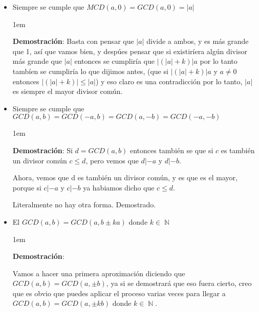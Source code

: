 \documentclass[12pt]{report}                                    %
\newenvironment{SmallIndentation}[1][0.75em]                    %
    {\begin{adjustwidth}{#1}{}\begin{footnotesize}}                 %
    {\end{footnotesize}\end{adjustwidth}}                           %
\DeclareMathOperator \Naturals  {\mathbb{N}}                     %
\begin{document}
\begin{itemize}
                \item Siempre se cumple que $MCD(a,0) = GCD(a,0) = |a|$

                    \begin{SmallIndentation}[1em]
                        \textbf{Demostración}:
                        Basta con pensar que $|a|$ divide a ambos, y es más grande que 1, así
                        que vamos bien, y despúes pensar que si existiríera algún divisor más
                        grande que $|a|$ entonces se cumpliría que  $|(|a|+k)|a$ por lo tanto tambíen
                        se cumpliría lo que dijimos antes, (que si $|(|a|+k)|a$ y $a \neq 0$
                        entonces $|(|a|+k)| \leq |a|$) y eso claro es una contradicción
                        por lo tanto, $|a|$ es siempre el mayor divisor común.

                    \end{SmallIndentation} 


                \clearpage

                \item Siempre se cumple que $GCD(a,b) = GCD(-a,b) = GCD(a,-b) = GCD(-a,-b)$

                    \begin{SmallIndentation}[1em]
                        \textbf{Demostración}:
                        Si $d= GCD(a,b)$ entonces también se que si $c$ es también un divisor común
                        $c\leq d$, pero vemos que $d|-a$ y $d|-b$.

                        Ahora, vemos que d es también un divisor común, y es que es el mayor, porque
                        si $c|-a$ y $c|-b$ ya habiamos dicho que $c\leq d$.

                        Literalmente no hay otra forma. Demostrado.

                    \end{SmallIndentation} 


                \item El $GCD(a,b) = GCD(a, b \pm ka)$ donde $k \in \Naturals$

                    \begin{SmallIndentation}[1em]
                        \textbf{Demostración}:
                        
                        Vamos a hacer una primera aproximación diciendo que $GCD(a,b)=GCD(a,\pm b)$, ya 
                        si se demostrará que eso fuera cierto, creo que es obvio que puedes aplicar el 
                        proceso varias veces para llegar a $GCD(a,b) = GCD(a, \pm kb)$ donde
                        $k \in \Naturals$.


\end{SmallIndentation}
\end{itemize}
\end{document}
